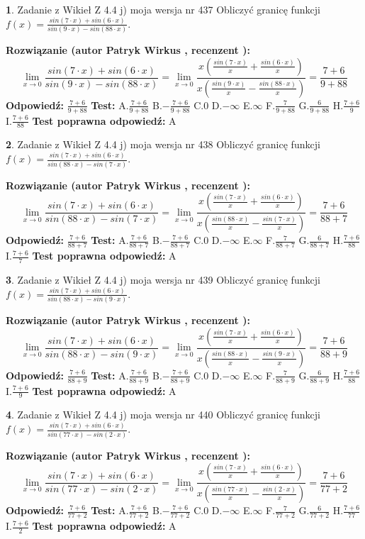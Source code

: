\documentclass[12pt, a4paper]{article}
\theoremstyle{definition} %
\newtheorem{zad}{}
\newcommand{\zadStart}[1]{\begin{zad}#1\newline}
\newcommand{\zadStop}{\end{zad}}
\newcommand{\rozwStart}[2]{\noindent \textbf{Rozwiązanie (autor #1 , recenzent #2): }\newline}
\newcommand{\rozwStop}{\newline}
\newcommand{\odpStart}{\noindent \textbf{Odpowiedź:}\newline}
\newcommand{\odpStop}{\newline}
\newcommand{\testStart}{\noindent \textbf{Test:}\newline}
\newcommand{\testStop}{\newline}
\newcommand{\kluczStart}{\noindent \textbf{Test poprawna odpowiedź:}\newline}
\newcommand{\kluczStop}{\newline}
\begin{document}
\zadStart{Zadanie z Wikieł Z 4.4 j) moja wersja nr 437}
Obliczyć granicę funkcji $f(x)=\frac{sin(7\cdot x) +sin(6\cdot x)}{sin(9\cdot x) -sin(88\cdot x)}$.
\zadStop
\rozwStart{Patryk Wirkus}{}
$$\lim\limits_{x\to 0}\frac{sin(7\cdot x) +sin(6\cdot x)}{sin(9\cdot x) -sin(88\cdot x)}=\lim\limits_{x\to 0}\frac{x(\frac{sin(7\cdot x)}{x}+\frac{sin(6\cdot x)}{x})}{x(\frac{sin(9\cdot x)}{x}-\frac{sin(88\cdot x)}{x})}=\frac{7+6}{9+88}$$
\rozwStop
\odpStart
$\frac{7+6}{9+88}$
\odpStop
\testStart
A.$\frac{7+6}{9+88}$
B.$-\frac{7+6}{9+88}$
C.$0$
D.$-\infty$
E.$\infty$
F.$\frac{7}{9+88}$
G.$\frac{6}{9+88}$
H.$\frac{7+6}{9}$
I.$\frac{7+6}{88}$
\testStop
\kluczStart
A
\kluczStop



\zadStart{Zadanie z Wikieł Z 4.4 j) moja wersja nr 438}
Obliczyć granicę funkcji $f(x)=\frac{sin(7\cdot x) +sin(6\cdot x)}{sin(88\cdot x) -sin(7\cdot x)}$.
\zadStop
\rozwStart{Patryk Wirkus}{}
$$\lim\limits_{x\to 0}\frac{sin(7\cdot x) +sin(6\cdot x)}{sin(88\cdot x) -sin(7\cdot x)}=\lim\limits_{x\to 0}\frac{x(\frac{sin(7\cdot x)}{x}+\frac{sin(6\cdot x)}{x})}{x(\frac{sin(88\cdot x)}{x}-\frac{sin(7\cdot x)}{x})}=\frac{7+6}{88+7}$$
\rozwStop
\odpStart
$\frac{7+6}{88+7}$
\odpStop
\testStart
A.$\frac{7+6}{88+7}$
B.$-\frac{7+6}{88+7}$
C.$0$
D.$-\infty$
E.$\infty$
F.$\frac{7}{88+7}$
G.$\frac{6}{88+7}$
H.$\frac{7+6}{88}$
I.$\frac{7+6}{7}$
\testStop
\kluczStart
A
\kluczStop



\zadStart{Zadanie z Wikieł Z 4.4 j) moja wersja nr 439}
Obliczyć granicę funkcji $f(x)=\frac{sin(7\cdot x) +sin(6\cdot x)}{sin(88\cdot x) -sin(9\cdot x)}$.
\zadStop
\rozwStart{Patryk Wirkus}{}
$$\lim\limits_{x\to 0}\frac{sin(7\cdot x) +sin(6\cdot x)}{sin(88\cdot x) -sin(9\cdot x)}=\lim\limits_{x\to 0}\frac{x(\frac{sin(7\cdot x)}{x}+\frac{sin(6\cdot x)}{x})}{x(\frac{sin(88\cdot x)}{x}-\frac{sin(9\cdot x)}{x})}=\frac{7+6}{88+9}$$
\rozwStop
\odpStart
$\frac{7+6}{88+9}$
\odpStop
\testStart
A.$\frac{7+6}{88+9}$
B.$-\frac{7+6}{88+9}$
C.$0$
D.$-\infty$
E.$\infty$
F.$\frac{7}{88+9}$
G.$\frac{6}{88+9}$
H.$\frac{7+6}{88}$
I.$\frac{7+6}{9}$
\testStop
\kluczStart
A
\kluczStop



\zadStart{Zadanie z Wikieł Z 4.4 j) moja wersja nr 440}
Obliczyć granicę funkcji $f(x)=\frac{sin(7\cdot x) +sin(6\cdot x)}{sin(77\cdot x) -sin(2\cdot x)}$.
\zadStop
\rozwStart{Patryk Wirkus}{}
$$\lim\limits_{x\to 0}\frac{sin(7\cdot x) +sin(6\cdot x)}{sin(77\cdot x) -sin(2\cdot x)}=\lim\limits_{x\to 0}\frac{x(\frac{sin(7\cdot x)}{x}+\frac{sin(6\cdot x)}{x})}{x(\frac{sin(77\cdot x)}{x}-\frac{sin(2\cdot x)}{x})}=\frac{7+6}{77+2}$$
\rozwStop
\odpStart
$\frac{7+6}{77+2}$
\odpStop
\testStart
A.$\frac{7+6}{77+2}$
B.$-\frac{7+6}{77+2}$
C.$0$
D.$-\infty$
E.$\infty$
F.$\frac{7}{77+2}$
G.$\frac{6}{77+2}$
H.$\frac{7+6}{77}$
I.$\frac{7+6}{2}$
\testStop
\kluczStart
A
\kluczStop
\end{document}
